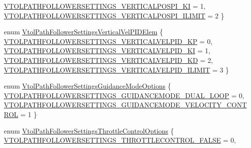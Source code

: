 \begin{DoxyCompactItemize}
\hyperlink{group___vtol_path_follower_settings_ggac103dd2958acb7d5e6d4dd550386f310a4312288a169a772eca2d7e834af56060}{\-V\-T\-O\-L\-P\-A\-T\-H\-F\-O\-L\-L\-O\-W\-E\-R\-S\-E\-T\-T\-I\-N\-G\-S\-\_\-\-V\-E\-R\-T\-I\-C\-A\-L\-P\-O\-S\-P\-I\-\_\-\-K\-I} = 1, 
\hyperlink{group___vtol_path_follower_settings_ggac103dd2958acb7d5e6d4dd550386f310a5bb04ea5e2bb85fcb70083c47068f0e8}{\-V\-T\-O\-L\-P\-A\-T\-H\-F\-O\-L\-L\-O\-W\-E\-R\-S\-E\-T\-T\-I\-N\-G\-S\-\_\-\-V\-E\-R\-T\-I\-C\-A\-L\-P\-O\-S\-P\-I\-\_\-\-I\-L\-I\-M\-I\-T} = 2
 \}
\item 
enum \hyperlink{group___vtol_path_follower_settings_ga987cc9f00fd51d23523f7b9e5fd51f3c}{\-Vtol\-Path\-Follower\-Settings\-Vertical\-Vel\-P\-I\-D\-Elem} \{ \hyperlink{group___vtol_path_follower_settings_gga987cc9f00fd51d23523f7b9e5fd51f3ca4667b6a34f9e455d814bb47f3f30a52a}{\-V\-T\-O\-L\-P\-A\-T\-H\-F\-O\-L\-L\-O\-W\-E\-R\-S\-E\-T\-T\-I\-N\-G\-S\-\_\-\-V\-E\-R\-T\-I\-C\-A\-L\-V\-E\-L\-P\-I\-D\-\_\-\-K\-P} = 0, 
\hyperlink{group___vtol_path_follower_settings_gga987cc9f00fd51d23523f7b9e5fd51f3caf5baa608363b943c5bc1683a76631552}{\-V\-T\-O\-L\-P\-A\-T\-H\-F\-O\-L\-L\-O\-W\-E\-R\-S\-E\-T\-T\-I\-N\-G\-S\-\_\-\-V\-E\-R\-T\-I\-C\-A\-L\-V\-E\-L\-P\-I\-D\-\_\-\-K\-I} = 1, 
\hyperlink{group___vtol_path_follower_settings_gga987cc9f00fd51d23523f7b9e5fd51f3ca75cd879766bfe1a119c7cdeaa0b1ccdb}{\-V\-T\-O\-L\-P\-A\-T\-H\-F\-O\-L\-L\-O\-W\-E\-R\-S\-E\-T\-T\-I\-N\-G\-S\-\_\-\-V\-E\-R\-T\-I\-C\-A\-L\-V\-E\-L\-P\-I\-D\-\_\-\-K\-D} = 2, 
\hyperlink{group___vtol_path_follower_settings_gga987cc9f00fd51d23523f7b9e5fd51f3ca13336fc7fa9c8fbf4a0fdb3515377051}{\-V\-T\-O\-L\-P\-A\-T\-H\-F\-O\-L\-L\-O\-W\-E\-R\-S\-E\-T\-T\-I\-N\-G\-S\-\_\-\-V\-E\-R\-T\-I\-C\-A\-L\-V\-E\-L\-P\-I\-D\-\_\-\-I\-L\-I\-M\-I\-T} = 3
 \}
\item 
enum \hyperlink{group___vtol_path_follower_settings_gabfa59293347eca24f22479bdb18e7232}{\-Vtol\-Path\-Follower\-Settings\-Guidance\-Mode\-Options} \{ \hyperlink{group___vtol_path_follower_settings_ggabfa59293347eca24f22479bdb18e7232a8bd480cb7dce1ef0385620afde65fcda}{\-V\-T\-O\-L\-P\-A\-T\-H\-F\-O\-L\-L\-O\-W\-E\-R\-S\-E\-T\-T\-I\-N\-G\-S\-\_\-\-G\-U\-I\-D\-A\-N\-C\-E\-M\-O\-D\-E\-\_\-\-D\-U\-A\-L\-\_\-\-L\-O\-O\-P} = 0, 
\hyperlink{group___vtol_path_follower_settings_ggabfa59293347eca24f22479bdb18e7232ad46418d87c8822da8082038a67790be8}{\-V\-T\-O\-L\-P\-A\-T\-H\-F\-O\-L\-L\-O\-W\-E\-R\-S\-E\-T\-T\-I\-N\-G\-S\-\_\-\-G\-U\-I\-D\-A\-N\-C\-E\-M\-O\-D\-E\-\_\-\-V\-E\-L\-O\-C\-I\-T\-Y\-\_\-\-C\-O\-N\-T\-R\-O\-L} = 1
 \}
\item 
enum \hyperlink{group___vtol_path_follower_settings_ga1d4e82ab04bc9417ed21a3ff641363f8}{\-Vtol\-Path\-Follower\-Settings\-Throttle\-Control\-Options} \{ \hyperlink{group___vtol_path_follower_settings_gga1d4e82ab04bc9417ed21a3ff641363f8a491068348c914340161db6ce91dee757}{\-V\-T\-O\-L\-P\-A\-T\-H\-F\-O\-L\-L\-O\-W\-E\-R\-S\-E\-T\-T\-I\-N\-G\-S\-\_\-\-T\-H\-R\-O\-T\-T\-L\-E\-C\-O\-N\-T\-R\-O\-L\-\_\-\-F\-A\-L\-S\-E} = 0, 

\end{DoxyCompactItemize}
